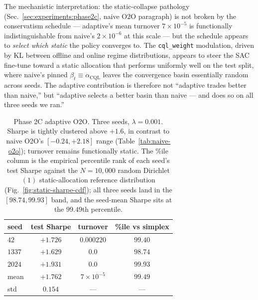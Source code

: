 The mechanistic interpretation: the static-collapse pathology
(Sec.~\ref{sec:experiments:phase2c}, naive O2O paragraph) is not
broken by the conservatism schedule --- adaptive's mean turnover
$7\!\times\!10^{-5}$ is functionally indistinguishable from naive's
$2\!\times\!10^{-6}$ at this scale --- but the schedule appears to
\emph{select which static} the policy converges to. The
\texttt{cql\_weight} modulation, driven by KL between offline and
online regime distributions, appears to steer the SAC fine-tune toward
a static allocation that performs uniformly well on the test split, where naive's pinned $\beta_t \equiv
\alpha_{\mathrm{CQL}}$ leaves the convergence basin essentially
random across seeds. The adaptive contribution is therefore not
``adaptive trades better than naive,'' but ``adaptive selects a
better basin than naive --- and does so on all three seeds we ran.''

\begin{table}[t]
\centering
\caption{Phase 2C adaptive O2O. Three seeds, $\lambda{=}0.001$.
Sharpe is tightly clustered above $+1.6$, in contrast to naive O2O's
$[-0.24, +2.18]$ range (Table~\ref{tab:naive-o2o}); turnover remains
functionally static. The \%ile column is the empirical percentile
rank of each seed's test Sharpe against the $N{=}10{,}000$ random
Dirichlet$(1)$ static-allocation reference distribution
(Fig.~\ref{fig:static-sharpe-cdf}); all three seeds land in the
$[98.74, 99.93]$ band, and the seed-mean Sharpe sits at the $99.49$th
percentile.}
\label{tab:adaptive-o2o}
\small
\begin{tabular}{lccc}
\toprule
seed   & test Sharpe & turnover             & \%ile vs simplex \\
\midrule
$42$   & $+1.726$    & $0.000220$           & $99.40$          \\
$1337$ & $+1.629$    & $0.0$                & $98.74$          \\
$2024$ & $+1.931$    & $0.0$                & $99.93$          \\
\midrule
mean   & $+1.762$    & $7\!\times\!10^{-5}$ & $99.49$          \\
std    & $0.154$     & ---                  & ---              \\
\bottomrule
\end{tabular}
\end{table}

